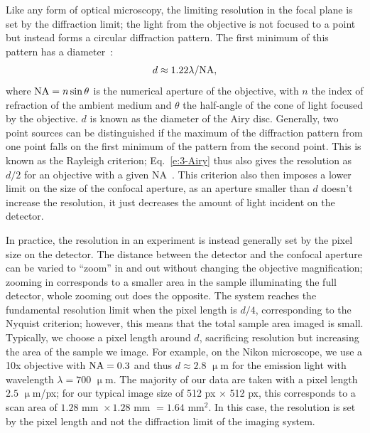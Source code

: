 Like any form of optical microscopy, the limiting resolution in the focal plane is set by the diffraction limit; the light from the objective is not focused to a point but instead forms a circular diffraction pattern.
The first minimum of this pattern has a diameter~\cite{RN314}:
\begin{equation}
d \approx 1.22 \lambda /{\rm NA},\label{e:3-Airy}
\end{equation}
where ${\rm NA} = n \sin \theta$ is the numerical aperture of the objective, with $n$ the index of refraction of the ambient medium and $\theta$ the half-angle of the cone of light focused by the objective.
$d$ is known as the diameter of the Airy disc.
Generally, two point sources can be distinguished if the maximum of the diffraction pattern from one point falls on the first minimum of the pattern from the second point.
This is known as the Rayleigh criterion; Eq.~\ref{e:3-Airy} thus also gives the resolution as $d/2$ for an objective with a given NA~\cite{RN314}.
This criterion also then imposes a lower limit on the size of the confocal aperture, as an aperture smaller than $d$ doesn't increase the resolution, it just decreases the amount of light incident on the detector.

In practice, the resolution in an experiment is instead generally set by the pixel size on the detector.
The distance between the detector and the confocal aperture can be varied to ``zoom'' in and out without changing the objective magnification; zooming in corresponds to a smaller area in the sample illuminating the full detector, whole zooming out does the opposite.
The system reaches the fundamental resolution limit when the pixel length is $d/4$, corresponding to the Nyquist criterion; however, this means that the total sample area imaged is small.
Typically, we choose a pixel length around $d$, sacrificing resolution but increasing the area of the sample we image.
For example, on the Nikon microscope, we use a 10x objective with ${\rm NA} = 0.3$ and thus $d \approx 2.8$ $\upmu$m for the emission light with wavelength $\lambda = 700$ $\upmu$m.
The majority of our data are taken with a pixel length $2.5$ $\upmu$m/px; for our typical image size of 512 px $\times$ 512 px, this corresponds to a scan area of $1.28\textrm{ mm } \times 1.28\textrm{ mm } = 1.64\textrm{ mm}^2$.
In this case, the resolution is set by the pixel length and not the diffraction limit of the imaging system.


